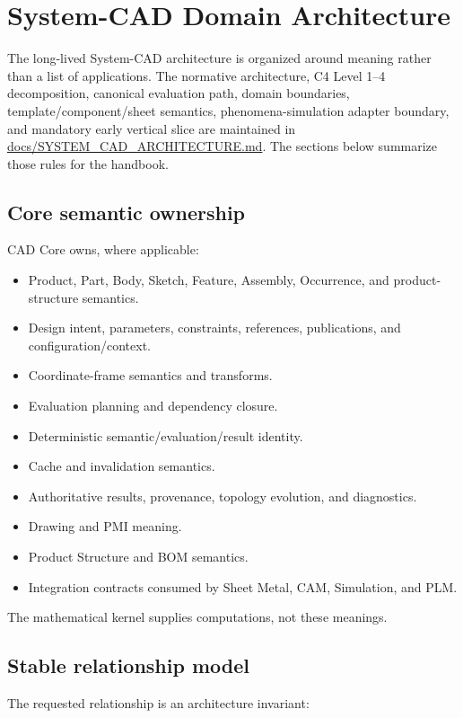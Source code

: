 \documentclass[11pt,a4paper]{report}
\newcommand{\pathref}[1]{\url{#1}}
\begin{document}
\chapter{System-CAD Domain Architecture}

The long-lived System-CAD architecture is organized around meaning rather than a list of applications. The normative architecture, C4 Level 1--4 decomposition, canonical evaluation path, domain boundaries, template/component/sheet semantics, phenomena-simulation adapter boundary, and mandatory early vertical slice are maintained in \pathref{docs/SYSTEM_CAD_ARCHITECTURE.md}. The sections below summarize those rules for the handbook.

\section{Core semantic ownership}

CAD Core owns, where applicable:

\begin{itemize}
\item Product, Part, Body, Sketch, Feature, Assembly, Occurrence, and product-structure semantics.
\item Design intent, parameters, constraints, references, publications, and configuration/context.
\item Coordinate-frame semantics and transforms.
\item Evaluation planning and dependency closure.
\item Deterministic semantic/evaluation/result identity.
\item Cache and invalidation semantics.
\item Authoritative results, provenance, topology evolution, and diagnostics.
\item Drawing and PMI meaning.
\item Product Structure and BOM semantics.
\item Integration contracts consumed by Sheet Metal, CAM, Simulation, and PLM.
\end{itemize}

The mathematical kernel supplies computations, not these meanings.

\section{Stable relationship model}

The requested relationship is an architecture invariant:
\end{document}
